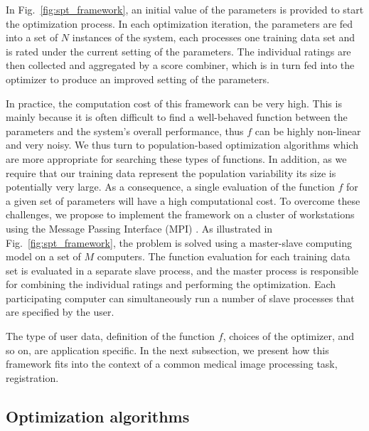 \documentclass[]{spie}  %
\begin{document}
In Fig.~\ref{fig:spt_framework}, an initial value of the parameters is provided to start the optimization process. In each optimization iteration, the parameters are fed into a set of $N$ instances of the system, each processes one training data set and is rated under the current setting of the parameters. The individual ratings are then collected and aggregated by a score combiner, which is in turn fed into the optimizer to produce an improved setting of the parameters.

In practice, the computation cost of this framework can be very high. This is mainly because it is often difficult to find a well-behaved function between the parameters and the system's overall performance, thus $f$ can be highly non-linear and very noisy. We thus turn to population-based optimization algorithms which are more appropriate for searching these types of functions. In addition, as we require that our training data represent the population variability its size is potentially very large. As a consequence, a single evaluation of
the function $f$ for a given set of parameters will have a high computational cost. To overcome these challenges, we propose to implement the framework on a cluster of workstations using the Message Passing Interface (MPI) \cite{SkjellumAn1994b}. As illustrated in Fig.~\ref{fig:spt_framework}, the problem is solved using a master-slave computing model on a set of $M$ computers. The function evaluation for each training data set is evaluated in a separate slave process, and the master process is responsible for combining the individual ratings and performing the optimization. Each participating computer can simultaneously run a number of slave processes that are specified by the user.

The type of user data, definition of the function $f$, choices of the optimizer, and so on, are application specific. In the next subsection, we present how this framework fits into the context of a common medical image processing task, registration.

\subsection{Optimization algorithms}
\end{document}
